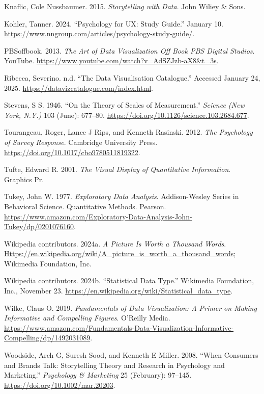 \documentclass[
  letterpaper,
  DIV=11,
  numbers=noendperiod]{scrartcl}
\newlength{\cslhangindent}
\newenvironment{CSLReferences}[2] %
 {\begin{list}{}{%
  \setlength{\itemindent}{0pt}
  \setlength{\leftmargin}{0pt}
  \setlength{\parsep}{0pt}
  \ifodd #1
   \setlength{\leftmargin}{\cslhangindent}
   \setlength{\itemindent}{-1\cslhangindent}
  \fi
  \setlength{\itemsep}{#2\baselineskip}}}
 {\end{list}}
\begin{document}
\begin{CSLReferences}{1}{1}
Knaflic, Cole Nussbaumer. 2015. \emph{Storytelling with Data}. John
Wiliey \& Sons.

Kohler, Tanner. 2024. {``Psychology for {UX}: Study Guide.''} January
10. \url{https://www.nngroup.com/articles/psychology-study-guide/}.

PBSoffbook. 2013. \emph{The Art of Data Visualization \textbar{} Off
Book \textbar{} {PBS} Digital Studios}. You{T}ube.
\url{https://www.youtube.com/watch?v=AdSZJzb-aX8&t=3s}.

Ribecca, Severino. n.d. {``The Data Visualisation Catalogue.''} Accessed
January 24, 2025. \url{https://datavizcatalogue.com/index.html}.

Stevens, S S. 1946. {``On the Theory of Scales of Measurement.''}
\emph{Science (New York, N.Y.)} 103 (June): 677--80.
\url{https://doi.org/10.1126/science.103.2684.677}.

Tourangeau, Roger, Lance J Rips, and Kenneth Rasinski. 2012. \emph{The
{P}sychology of {S}urvey {R}esponse}. Cambridge University Press.
\url{https://doi.org/10.1017/cbo9780511819322}.

Tufte, Edward R. 2001. \emph{The {V}isual {D}isplay of {Q}uantitative
{I}nformation}. Graphics Pr.

Tukey, John W. 1977. \emph{Exploratory Data Analysis}. Addison-Wesley
Series in Behavioral Science. Quantitative Methods. Pearson.
\url{https://www.amazon.com/Exploratory-Data-Analysis-John-Tukey/dp/0201076160}.

Wikipedia contributors. 2024a. \emph{A Picture Is Worth a Thousand
Words}.
\href{https://en.wikipedia.org/wiki/A_picture_is_worth_a_thousand_words}{Https://en.wikipedia.org/wiki/A\_picture\_is\_worth\_a\_thousand\_words};
Wikimedia Foundation, Inc.

Wikipedia contributors. 2024b. {``Statistical Data Type.''} Wikimedia
Foundation, Inc., November 23.
\url{https://en.wikipedia.org/wiki/Statistical_data_type}.

Wilke, Claus O. 2019. \emph{Fundamentals of Data Visualization: A Primer
on Making Informative and Compelling Figures}. O'Reilly Media.
\url{https://www.amazon.com/Fundamentals-Data-Visualization-Informative-Compelling/dp/1492031089}.

Woodside, Arch G, Suresh Sood, and Kenneth E Miller. 2008. {``When
Consumers and Brands Talk: Storytelling Theory and Research in
Psychology and Marketing.''} \emph{Psychology \& Marketing} 25
(February): 97--145. \url{https://doi.org/10.1002/mar.20203}.

\end{CSLReferences}
\end{document}
